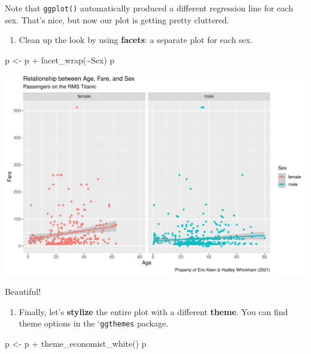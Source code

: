 \documentclass[
]{book}
\newenvironment{Shaded}{\begin{snugshade}}{\end{snugshade}}
\newcommand{\FunctionTok}[1]{\textcolor[rgb]{0.00,0.00,0.00}{#1}}
\newcommand{\NormalTok}[1]{#1}
\newcommand{\OtherTok}[1]{\textcolor[rgb]{0.56,0.35,0.01}{#1}}
\newcommand{\SpecialCharTok}[1]{\textcolor[rgb]{0.00,0.00,0.00}{#1}}
\providecommand{\tightlist}{%
  \setlength{\itemsep}{0pt}\setlength{\parskip}{0pt}}
\begin{document}
Note that \texttt{ggplot()} automatically produced a different regression line for each sex. That's nice, but now our plot is getting pretty cluttered.

\begin{enumerate}
\def\labelenumi{(\arabic{enumi})}
\setcounter{enumi}{6}
\tightlist
\item
  Clean up the look by using \textbf{facets}: a separate plot for each sex.
\end{enumerate}

\begin{Shaded}
\begin{Highlighting}[]
\NormalTok{p }\OtherTok{\textless{}{-}}\NormalTok{ p }\SpecialCharTok{+} \FunctionTok{facet\_wrap}\NormalTok{(}\SpecialCharTok{\textasciitilde{}}\NormalTok{Sex)}
\NormalTok{p}
\end{Highlighting}
\end{Shaded}

\includegraphics[width=694.08px]{figures/unnamed-chunk-163-1}

Beautiful!

\begin{enumerate}
\def\labelenumi{(\arabic{enumi})}
\setcounter{enumi}{7}
\tightlist
\item
  Finally, let's \textbf{stylize} the entire plot with a different \textbf{theme}. You can find theme options in the `\texttt{ggthemes} package.
\end{enumerate}

\begin{Shaded}
\begin{Highlighting}[]
\NormalTok{p }\OtherTok{\textless{}{-}}\NormalTok{ p }\SpecialCharTok{+} \FunctionTok{theme\_economist\_white}\NormalTok{()}
\NormalTok{p}
\end{Highlighting}
\end{Shaded}
\end{document}
